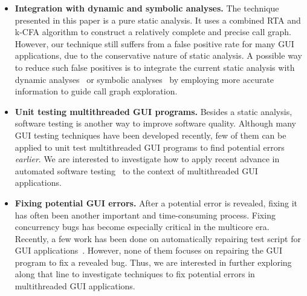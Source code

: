 \begin{itemize}

\item \textbf{Integration with dynamic and symbolic analyses.} The technique 
presented in this paper is a pure static analysis. It
uses a combined RTA and k-CFA  algorithm to construct a relatively
complete and precise call graph. However, our technique still suffers from
a false positive rate for many GUI applications, due to the conservative
nature of static analysis. A possible way to reduce such false
positives is to integrate the current static analysis with
dynamic analyses~\cite{Jiang:2008:PPS:1453101.1453110, ZhangSBE2011}
or symbolic analyses~\cite{xie05:symstra, Pasareanu:2011, halfond09issta, BMF97}
by employing more accurate information to guide call graph exploration.

\item \textbf{Unit testing multithreaded GUI programs.} Besides
a static analysis,  software testing is another
way to improve software quality.  Although many
GUI testing techniques have been developed recently, few of them can be applied
to unit test multithreaded GUI programs to find potential errors \textit{earlier}. We
are interested to investigate how to apply recent advance in automated
software testing~\cite{Staats:2011:PTO:1985793.1985847, Jagannath:2011:IMU:2025113.2025145, Muccini_Bertolino_Inverardi_2004, Ricca:2001:ATW:381473.381476, Harman:2007}
to the context of multithreaded GUI applications.


\item \textbf{Fixing potential GUI errors.} After a potential error is revealed, fixing
it has often been another important and time-consuming process. Fixing concurrency
bugs has become especially critical in the multicore era.
Recently, a few work has been done
on automatically repairing test script for GUI applications~\cite{Daniel:2011:AGR:2002931.2002937, Huang:2010:RGT:1828417.1828465}. However, none of them focuses on repairing
the GUI program to fix a revealed bug. Thus, we are interested in further exploring 
along that line to investigate techniques to fix potential errors in
multithreaded GUI applications.

\end{itemize}

